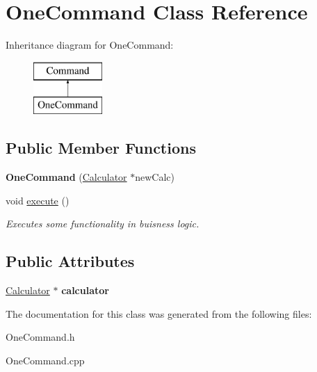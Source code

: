 \hypertarget{class_one_command}{}\section{One\+Command Class Reference}
\label{class_one_command}
Inheritance diagram for One\+Command\+:\begin{figure}[H]
\begin{center}
\leavevmode
\includegraphics[height=2.000000cm]{class_one_command}
\end{center}
\end{figure}
\subsection*{Public Member Functions}
\begin{DoxyCompactItemize}
\item 
\hypertarget{class_one_command_a20db00d94b5c1d86603be7d91fcd0303}{}{\bfseries One\+Command} (\hyperlink{class_calculator}{Calculator} $\ast$new\+Calc)\label{class_one_command_a20db00d94b5c1d86603be7d91fcd0303}

\item 
\hypertarget{class_one_command_a5a044d694cd01f447d1f57ac25dccd01}{}void \hyperlink{class_one_command_a5a044d694cd01f447d1f57ac25dccd01}{execute} ()\label{class_one_command_a5a044d694cd01f447d1f57ac25dccd01}

\begin{DoxyCompactList}\small\item\em Executes some functionality in buisness logic. \end{DoxyCompactList}\end{DoxyCompactItemize}
\subsection*{Public Attributes}
\begin{DoxyCompactItemize}
\item 
\hypertarget{class_one_command_a8867d5fb2fd62bfcd2a7d9f69bf08d93}{}\hyperlink{class_calculator}{Calculator} $\ast$ {\bfseries calculator}\label{class_one_command_a8867d5fb2fd62bfcd2a7d9f69bf08d93}

\end{DoxyCompactItemize}


The documentation for this class was generated from the following files\+:\begin{DoxyCompactItemize}
\item 
One\+Command.\+h\item 
One\+Command.\+cpp\end{DoxyCompactItemize}

